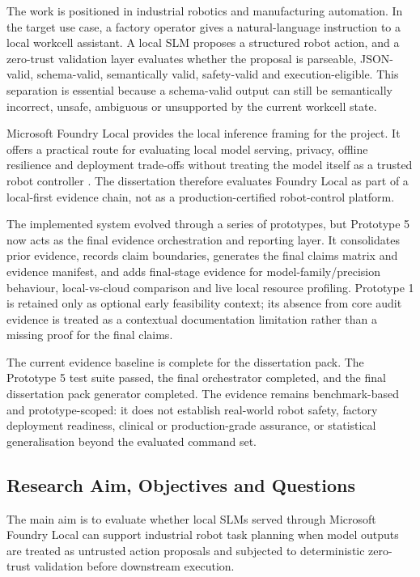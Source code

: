 \documentclass[sigconf,nonacm]{acmart}
\begin{document}
The work is positioned in industrial robotics and manufacturing automation. In the target use case, a factory operator gives a natural-language instruction to a local workcell assistant. A local SLM proposes a structured robot action, and a zero-trust validation layer evaluates whether the proposal is parseable, JSON-valid, schema-valid, semantically valid, safety-valid and execution-eligible. This separation is essential because a schema-valid output can still be semantically incorrect, unsafe, ambiguous or unsupported by the current workcell state.

Microsoft Foundry Local provides the local inference framing for the project. It offers a practical route for evaluating local model serving, privacy, offline resilience and deployment trade-offs without treating the model itself as a trusted robot controller \cite{microsoft_foundry_local_docs}. The dissertation therefore evaluates Foundry Local as part of a local-first evidence chain, not as a production-certified robot-control platform.

The implemented system evolved through a series of prototypes, but Prototype 5 now acts as the final evidence orchestration and reporting layer. It consolidates prior evidence, records claim boundaries, generates the final claims matrix and evidence manifest, and adds final-stage evidence for model-family/precision behaviour, local-vs-cloud comparison and live local resource profiling. Prototype 1 is retained only as optional early feasibility context; its absence from core audit evidence is treated as a contextual documentation limitation rather than a missing proof for the final claims.

The current evidence baseline is complete for the dissertation pack. The Prototype 5 test suite passed, the final orchestrator completed, and the final dissertation pack generator completed. The evidence remains benchmark-based and prototype-scoped: it does not establish real-world robot safety, factory deployment readiness, clinical or production-grade assurance, or statistical generalisation beyond the evaluated command set.


\subsection{Research Aim, Objectives and Questions}
\label{sec:research_aims_questions}

The main aim is to evaluate whether local SLMs served through Microsoft Foundry Local can support industrial robot task planning when model outputs are treated as untrusted action proposals and subjected to deterministic zero-trust validation before downstream execution.
\end{document}
